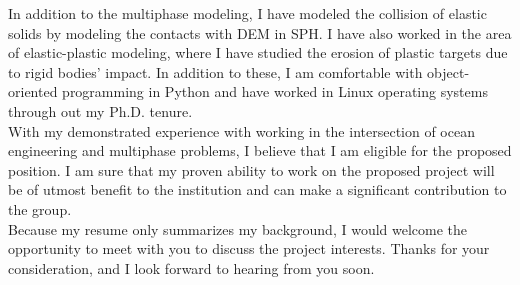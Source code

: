 \documentclass[11pt,a4paper,roman]{moderncv}
\begin{document}
\vspace{1em}
In addition to the multiphase modeling, I have modeled the collision of elastic
solids by modeling the contacts with DEM in SPH. I have also worked in the area
of elastic-plastic modeling, where I have studied the erosion of plastic targets
due to rigid bodies' impact. In addition to these, I am comfortable with
object-oriented programming in Python and have worked in Linux operating systems
through out my Ph.D. tenure.\\


\vspace{1em}
With my demonstrated experience with working in the intersection of ocean
engineering and multiphase problems, I believe that I am eligible for the proposed
position. I am sure that my proven ability to work on the proposed project will
be of utmost benefit to the institution and can make a significant
contribution to the group.\\


\vspace{1em}
Because my resume only summarizes my background, I would welcome the opportunity
to meet with you to discuss the project interests. Thanks for your
consideration, and I look forward to hearing from you soon.\\



\vspace{0.5cm}


\makeletterclosing
\end{document}
